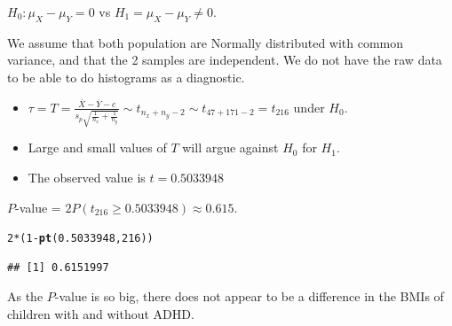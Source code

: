 \documentclass[t,xcolor=pdftex,dvipsnames,table]{beamer}\usepackage[]{graphicx}\usepackage[]{color}
\makeatletter
\newcommand{\hlnum}[1]{\textcolor[rgb]{0.686,0.059,0.569}{#1}}%
\newcommand{\hlopt}[1]{\textcolor[rgb]{0,0,0}{#1}}%
\newcommand{\hlstd}[1]{\textcolor[rgb]{0.345,0.345,0.345}{#1}}%
\newcommand{\hlkwd}[1]{\textcolor[rgb]{0.737,0.353,0.396}{\textbf{#1}}}%
\newenvironment{kframe}{%
 \def\at@end@of@kframe{}%
 \ifinner\ifhmode%
  \def\at@end@of@kframe{\end{minipage}}%
  \begin{minipage}{\columnwidth}%
 \fi\fi%
 \def\FrameCommand##1{\hskip\@totalleftmargin \hskip-\fboxsep
 \colorbox{shadecolor}{##1}\hskip-\fboxsep
     \hskip-\linewidth \hskip-\@totalleftmargin \hskip\columnwidth}%
 \MakeFramed {\advance\hsize-\width
   \@totalleftmargin\z@ \linewidth\hsize
   \@setminipage}}%
 {\par\unskip\endMakeFramed%
 \at@end@of@kframe}
\newenvironment{knitrout}{}{} %
\makeatother
\begin{document}
\begin{frame}[fragile]{}
$H_{0}: \mu_{X} - \mu_{Y} = 0$ vs $H_{1} =  \mu_{X} - \mu_{Y} \neq  0$.

\vspace{.5cm}
 We assume that both population are Normally distributed with common variance, and that the 2 samples are independent. We do not have the raw data to be able to do histograms as a diagnostic.

\begin{itemize}
\item $\tau = T = \frac{ \bar{X} - \bar{Y} - c }{ s_{p}  \sqrt{ \frac{1}{n_{x}} + \frac{1}{n_{y}} }}  \sim t_{ n_{x} + n_{y}-2 } \sim t_{47+171-2} = t_{216}$ under $H_{0}$. 
\item Large and small values of $T$ will argue against $H_{0}$ for $H_{1}$. 
\item The observed value is $t=  0.5033948$
\end{itemize}

\vspace{.5cm}
 $P$-value = $2 P( t_{216} \geq 0.5033948) \approx  0.615$.

\begin{knitrout}
\color{fgcolor}\begin{kframe}
\begin{alltt}
\hlnum{2}\hlopt{*}\hlstd{(}\hlnum{1}\hlopt{-}\hlkwd{pt}\hlstd{(}\hlnum{0.5033948}\hlstd{,}\hlnum{216}\hlstd{))}
\end{alltt}
\begin{verbatim}
## [1] 0.6151997
\end{verbatim}
\end{kframe}
\end{knitrout}
\end{frame}  

\begin{frame}[fragile]{}
 As the $P$-value is so big, there does not appear to be a difference in the BMIs of children with and without ADHD.
\end{frame} 
\end{document}
